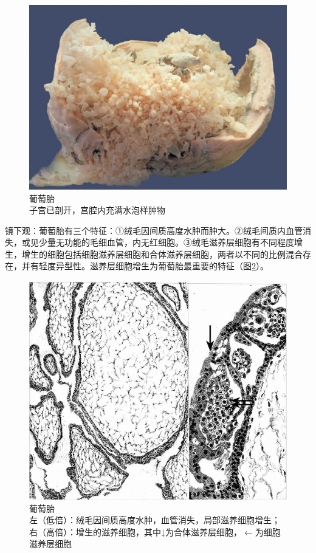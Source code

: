 \begin{figure}[!htbp]
 \centering
 \includegraphics{./images/Image00188.jpg}
 \captionsetup{justification=centering}
 \caption{葡萄胎\\ {\small 子宫已剖开，宫腔内充满水泡样肿物}}
\label{fig11-4}
  \end{figure}

镜下观：葡萄胎有三个特征：①绒毛因间质高度水肿而肿大。②绒毛间质内血管消失，或见少量无功能的毛细血管，内无红细胞。③绒毛滋养层细胞有不同程度增生，增生的细胞包括细胞滋养层细胞和合体滋养层细胞，两者以不同的比例混合存在，并有轻度异型性。滋养层细胞增生为葡萄胎最重要的特征（图\ref{fig11-5}）。

\begin{figure}[!htbp]
 \centering
 \includegraphics{./images/Image00189.jpg}
 \captionsetup{justification=centering}
 \caption{葡萄胎\\ {\small 左（低倍）：绒毛因间质高度水肿，血管消失，局部滋养细胞增生；右（高倍）：增生的滋养细胞，其中↓为合体滋养层细胞，$\leftarrow$为细胞滋养层细胞}}
\label{fig11-5}
  \end{figure}


